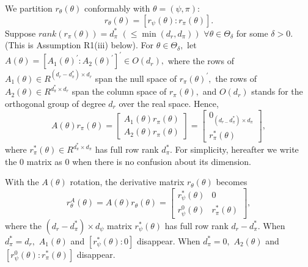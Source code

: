 \documentclass[12pt,thmsb,titlepage,final,oneside,letterpaper]{article}
\begin{document}
We partition $r_{\theta }(\theta )$ conformably with $\theta =(\psi ,\pi )$:%
\begin{equation}
r_{\theta }(\theta )=[r_{\psi }(\theta ):r_{\pi }(\theta )].
\end{equation}%
Suppose $rank(r_{\pi }(\theta ))=d_{\pi }^{\ast }$ $(\leq \min (d_{r},d_{\pi
}))$ $\forall \theta \in \Theta _{\delta }$ for some $\delta >0.$ (This is
Assumption R1(iii) below). For $\theta \in \Theta _{\delta },$ let $A(\theta
)=[A_{1}(\theta )^{\prime }:A_{2}(\theta )^{\prime }]^{\prime }\in O(d_{r}),$
where the rows of $A_{1}(\theta )\in R^{(d_{r}-d_{\pi }^{\ast })\times
d_{r}} $ span the null space of $r_{\pi }(\theta )^{\prime },$ the rows of $%
A_{2}(\theta )\in R^{d_{\pi }^{\ast }\times d_{r}}$ span the column space of 
$r_{\pi }(\theta ),$ and $O(d_{r})$ stands for the orthogonal group of
degree $d_{r}$ over the real space. Hence,%
\begin{equation}
A(\theta )r_{\pi }(\theta )=\left[ 
\begin{array}{c}
A_{1}(\theta )r_{\pi }(\theta ) \\ 
A_{2}(\theta )r_{\pi }(\theta )%
\end{array}%
\right] =\left[ 
\begin{array}{c}
0_{(d_{r-}d_{\pi }^{\ast })\times d_{\pi }} \\ 
r_{\pi }^{\ast }(\theta )%
\end{array}%
\right] ,
\end{equation}%
where $r_{\pi }^{\ast }(\theta )\in R^{d_{\pi }^{\ast }\times d_{\pi }}$ has
full row rank $d_{\pi }^{\ast }.$ For simplicity, hereafter we write the $0$
matrix as $0$ when there is no confusion about its dimension.

With the $A(\theta )$ rotation, the derivative matrix $r_{\theta }(\theta )$
becomes 
\begin{equation}
r_{\theta }^{A}(\theta )=A(\theta )r_{\theta }(\theta )=\left[ 
\begin{array}{cc}
r_{\psi }^{\ast }(\theta ) & 0 \\ 
r_{\psi }^{0}(\theta ) & r_{\pi }^{\ast }(\theta )%
\end{array}%
\right] ,  \label{r_A matrix}
\end{equation}%
where the $(d_{r}-d_{\pi }^{\ast })\times d_{\psi }$ matrix $r_{\psi }^{\ast
}(\theta )$ has full row rank $d_{r}-d_{\pi }^{\ast }.$ When $d_{\pi }^{\ast
}=d_{r},$ $A_{1}(\theta )$ and $[r_{\psi }^{\ast }(\theta ):0]$ disappear.
When $d_{\pi }^{\ast }=0,$ $A_{2}(\theta )$ and $[r_{\psi }^{0}(\theta
):r_{\pi }^{\ast }(\theta )]$ disappear.
\end{document}
